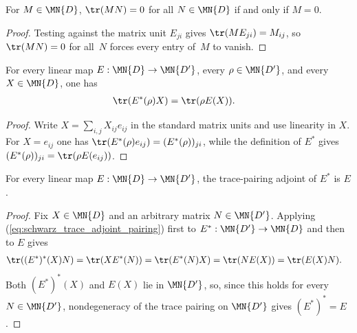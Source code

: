 \begin{theorem}\label{thm:trace_nondeg}
    \leanok
    For $M \in \MN{D}$, $\tr(M N) = 0$ for all $N \in \MN{D}$ if and only if
    $M = 0$.
\end{theorem}

\begin{proof}
    \leanok
    Testing against the matrix unit $E_{ji}$ gives $\tr(M E_{ji}) = M_{ij}$, so
    $\tr(M N) = 0$ for all~$N$ forces every entry of~$M$ to vanish.
\end{proof}

\begin{theorem}\label{thm:trace_pairing_adjoint_identity}
    \leanok
    For every linear map $E : \MN{D} \to \MN{D'}$, every $\rho \in \MN{D'}$,
    and every $X \in \MN{D}$, one has
    \begin{align}
        \tr(E^*(\rho)X)
         & =\tr(\rho E(X)).
        \label{eq:schwarz_trace_adjoint_pairing}
    \end{align}
\end{theorem}

\begin{proof}
    \leanok
    Write $X=\sum_{i,j}X_{ij}e_{ij}$ in the standard matrix units and use
    linearity in $X$. For $X=e_{ij}$ one has
    $\tr(E^*(\rho)e_{ij})=(E^*(\rho))_{ji}$, while the definition of $E^*$
    gives $(E^*(\rho))_{ji}=\tr(\rho E(e_{ij}))$.
\end{proof}

\begin{theorem}\label{thm:trace_pairing_adjoint_involutive}
    \leanok
    For every linear map $E : \MN{D} \to \MN{D'}$, the trace-pairing adjoint
    of $E^*$ is $E$.
\end{theorem}

\begin{proof}
    \leanok
    Fix $X\in\MN{D}$ and an arbitrary matrix $N\in\MN{D'}$. Applying
    (\ref{eq:schwarz_trace_adjoint_pairing}) first to
    $E^* : \MN{D'} \to \MN{D}$ and then to $E$ gives
    \begin{align}
        \tr((E^*)^*(X)N)
         & =\tr(XE^*(N))
        =\tr(E^*(N)X)
        =\tr(NE(X))
        =\tr(E(X)N).
        \notag
    \end{align}
    Both $(E^*)^*(X)$ and $E(X)$ lie in $\MN{D'}$, so, since this holds for
    every $N\in\MN{D'}$, nondegeneracy of the trace pairing on $\MN{D'}$
    gives $(E^*)^*=E$.
\end{proof}

